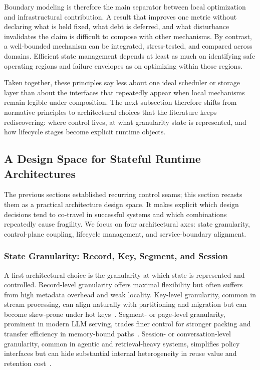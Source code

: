 \documentclass[acmsmall,screen,review]{acmart}
\begin{document}
Boundary modeling is therefore the main separator between local optimization and infrastructural contribution. A result that improves one metric without declaring what is held fixed, what debt is deferred, and what disturbance invalidates the claim is difficult to compose with other mechanisms. By contrast, a well-bounded mechanism can be integrated, stress-tested, and compared across domains. Efficient state management depends at least as much on identifying safe operating regions and failure envelopes as on optimizing within those regions.

Taken together, these principles say less about one ideal scheduler or storage layer than about the interfaces that repeatedly appear when local mechanisms remain legible under composition. The next subsection therefore shifts from normative principles to architectural choices that the literature keeps rediscovering: where control lives, at what granularity state is represented, and how lifecycle stages become explicit runtime objects.

\subsection{A Design Space for Stateful Runtime Architectures}

The previous sections established recurring control seams; this section recasts them as a practical architecture design space. It makes explicit which design decisions tend to co-travel in successful systems and which combinations repeatedly cause fragility. We focus on four architectural axes: state granularity, control-plane coupling, lifecycle management, and service-boundary alignment.

\subsubsection{State Granularity: Record, Key, Segment, and Session}

A first architectural choice is the granularity at which state is represented and controlled. Record-level granularity offers maximal flexibility but often suffers from high metadata overhead and weak locality. Key-level granularity, common in stream processing, can align naturally with partitioning and migration but can become skew-prone under hot keys~\cite{zhang2019briskstream,mao2025spacker}. Segment- or page-level granularity, prominent in modern LLM serving, trades finer control for stronger packing and transfer efficiency in memory-bound paths~\cite{kwon2023pagedattention,agrawal2024sarathi}. Session- or conversation-level granularity, common in agentic and retrieval-heavy systems, simplifies policy interfaces but can hide substantial internal heterogeneity in reuse value and retention cost~\cite{zheng2023sglang,wang2024hipporag}.
\end{document}
